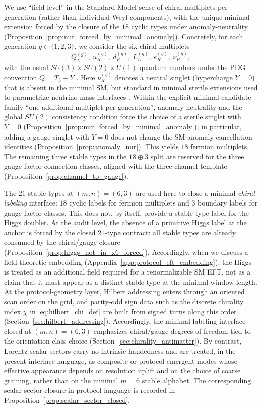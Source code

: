We use ``field-level'' in the Standard Model sense of chiral multiplets per generation (rather than individual Weyl components), with the unique minimal extension forced by the closure of the $18$ cyclic types under anomaly-neutrality (Proposition~\ref{prop:nur_forced_by_minimal_anomaly}).
Concretely, for each generation $g\in\{1,2,3\}$, we consider the six chiral multiplets
\[
Q_L^{(g)},\ u_R^{(g)},\ d_R^{(g)},\ L_L^{(g)},\ e_R^{(g)},\ \nu_R^{(g)},
\]
with the usual $SU(3)\times SU(2)\times U(1)$ quantum numbers under the PDG convention $Q=T_3+Y$ \cite{PeskinSchroeder1995,PDGRPP2024}.
Here $\nu_R^{(g)}$ denotes a neutral singlet (hypercharge $Y=0$) that is absent in the minimal SM, but standard in minimal sterile extensions used to parametrize neutrino mass interfaces \cite{PDGRPP2024}.
Within the explicit minimal candidate family ``one additional multiplet per generation'', anomaly neutrality and the global $SU(2)$ consistency condition force the choice of a sterile singlet with $Y=0$ (Proposition~\ref{prop:nur_forced_by_minimal_anomaly}); in particular, adding a gauge singlet with $Y=0$ does not change the SM anomaly-cancellation identities (Proposition~\ref{prop:anomaly_nur}).
This yields $18$ fermion multiplets.
The remaining three stable types in the $18\oplus 3$ split are reserved for the three gauge-factor connection classes, aligned with the three-channel template (Proposition~\ref{prop:channel_to_gauge}).
\begin{remark}\label{rem:higgs_not_in_21}
The $21$ stable types at $(m,n)=(6,3)$ are used here to close a minimal \emph{chiral labeling} interface: $18$ cyclic labels for fermion multiplets and $3$ boundary labels for gauge-factor classes.
This does not, by itself, provide a stable-type label for the Higgs doublet.
At the audit level, the absence of a primitive Higgs label at the anchor is forced by the closed $21$-type contract: all stable types are already consumed by the chiral/gauge closure (Proposition~\ref{prop:higgs_not_in_x6_forced}).
Accordingly, when we discuss a field-theoretic embedding (Appendix~\ref{app:protocol_eft_embedding}), the Higgs is treated as an additional field required for a renormalizable SM EFT, not as a claim that it must appear as a distinct stable type at the minimal window length.
\AuditTag At the protocol-geometry layer, Hilbert addressing enters through an oriented scan order on the grid, and parity-odd sign data such as the discrete chirality index $\chi$ in \eqref{eq:hilbert_chi_def} are built from signed turns along this order (Section~\ref{sec:hilbert_addressing}).
\AuditTag Accordingly, the minimal labeling interface closed at $(m,n)=(6,3)$ emphasizes chiral/gauge degrees of freedom tied to the orientation-class choice (Section~\ref{sec:chirality_antimatter}).
By contrast, Lorentz-scalar sectors carry no intrinsic handedness and are treated, in the present interface language, as composite or protocol-emergent modes whose effective appearance depends on resolution uplift and on the choice of coarse graining, rather than on the minimal $m=6$ stable alphabet.
The corresponding scalar-sector closure in protocol language is recorded in Proposition~\ref{prop:scalar_sector_closed}.
\end{remark}

